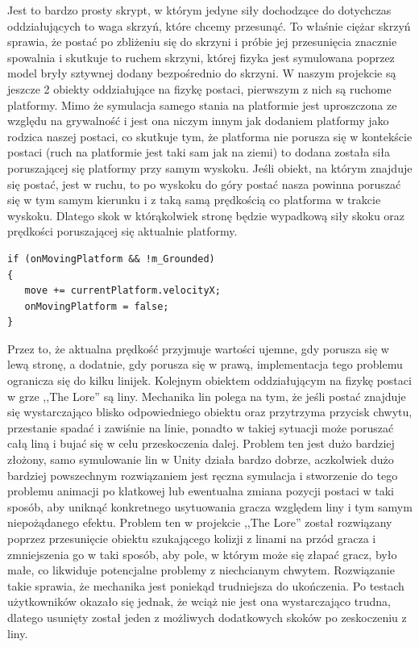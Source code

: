 \documentclass[oneside,polski,logo]{amuthesis}
\begin{document}
Jest to bardzo prosty skrypt, w którym jedyne siły dochodzące do dotychczas oddziałujących to waga skrzyń, które chcemy przesunąć. To właśnie ciężar skrzyń sprawia, że postać po zbliżeniu się do skrzyni i próbie jej przesunięcia znacznie spowalnia i skutkuje to ruchem skrzyni, której fizyka jest symulowana poprzez model bryły sztywnej dodany bezpośrednio do skrzyni.
W naszym projekcie są jeszcze 2 obiekty oddziałujące na fizykę postaci, pierwszym z nich są ruchome platformy. Mimo że symulacja samego stania na platformie jest uproszczona ze względu na grywalność i jest ona niczym innym jak dodaniem platformy jako rodzica naszej postaci, co skutkuje tym, że platforma nie porusza się w kontekście postaci (ruch na platformie jest taki sam jak na ziemi) to dodana została siła poruszającej się platformy przy samym wyskoku. Jeśli obiekt, na którym znajduje się postać, jest w ruchu, to po wyskoku do góry postać nasza powinna poruszać się w tym samym kierunku i z taką samą prędkością co platforma w trakcie wyskoku. Dlatego skok w którąkolwiek stronę będzie wypadkową siły skoku oraz prędkości poruszającej się aktualnie platformy.

\begin{lstlisting}[breaklines=true,
language={[Sharp]C},
rulecolor=\color{blue!80!black},
caption={Fragment klasy \texttt{PlayerMovement.cs}}
]
if (onMovingPlatform && !m_Grounded)
{
   move += currentPlatform.velocityX;
   onMovingPlatform = false;
}
\end{lstlisting}
Przez to, że aktualna prędkość przyjmuje wartości ujemne, gdy porusza się w lewą stronę, a dodatnie, gdy porusza się w prawą, implementacja tego problemu ogranicza się do kilku linijek.
Kolejnym obiektem oddziałującym na fizykę postaci w grze ,,The Lore'' są liny. Mechanika lin polega na tym, że jeśli postać znajduje się wystarczająco blisko odpowiedniego obiektu oraz przytrzyma przycisk chwytu, przestanie spadać i zawiśnie na linie, ponadto w takiej sytuacji może poruszać całą liną i bujać się w celu przeskoczenia dalej. Problem ten jest dużo bardziej złożony, samo symulowanie lin w Unity działa bardzo dobrze, aczkolwiek dużo bardziej powszechnym rozwiązaniem jest ręczna symulacja i stworzenie do tego problemu animacji po klatkowej lub ewentualna zmiana pozycji postaci w taki sposób, aby uniknąć konkretnego usytuowania gracza względem liny i tym samym niepożądanego efektu. Problem ten w projekcie ,,The Lore'' został rozwiązany poprzez przesunięcie obiektu szukającego kolizji z linami na przód gracza i zmniejszenia go w taki sposób, aby pole, w którym może się złapać gracz, było małe, co likwiduje potencjalne problemy z niechcianym chwytem. Rozwiązanie takie sprawia, że mechanika jest poniekąd trudniejsza do ukończenia. Po testach użytkowników okazało się jednak, że wciąż nie jest ona wystarczająco trudna, dlatego usunięty został jeden z możliwych dodatkowych skoków po zeskoczeniu z liny.
\end{document}
